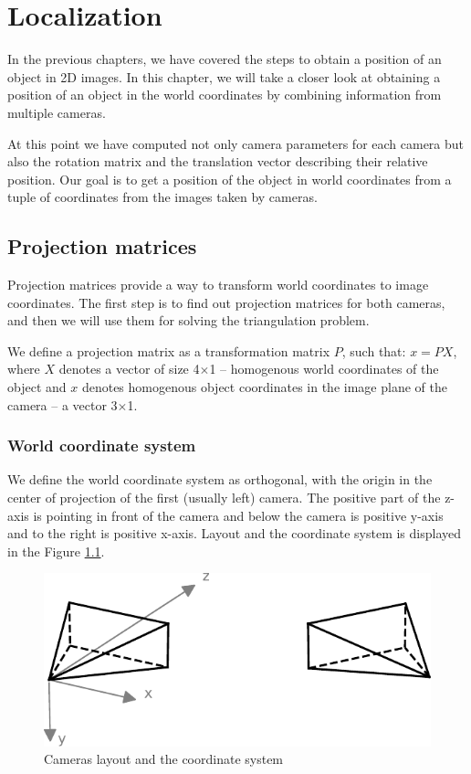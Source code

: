 \chapter{Localization}

In the previous chapters, we have covered the steps to obtain a position of
an object in 2D images. In this chapter, we will take a closer look at
obtaining a position of an object in the world coordinates by combining
information from multiple cameras.

At this point we have computed not only camera parameters for each camera but
also the rotation matrix and the translation vector describing their relative
position. Our goal is to get a position of the object in world coordinates from
a tuple of coordinates from the images taken by cameras.

\section{Projection matrices}
Projection matrices provide a way to transform world coordinates to image
coordinates. The first step is to find out projection matrices for both
cameras, and then we will use them for solving the triangulation problem.

We define a projection matrix as a transformation matrix $P$, such that: $x = P
 X$, where $X$ denotes a vector of size 4$\times$1 -- homogenous world coordinates
of the object and $x$ denotes homogenous object coordinates in the image plane
of the camera -- a vector 3$\times$1.

\subsection{World coordinate system}
We define the world coordinate system as orthogonal, with the origin in the
center of projection of the first (usually left) camera. The positive part of
the z-axis is pointing in front of the camera and below the camera is positive
y-axis and to the right is positive x-axis. Layout and the coordinate system is
displayed in the Figure \ref{fig:coordinate-system}.

\begin{figure}
\centering
\includegraphics{img/camera-positions}
\caption{Cameras layout and the coordinate system}
\label{fig:coordinate-system}
\end{figure}

